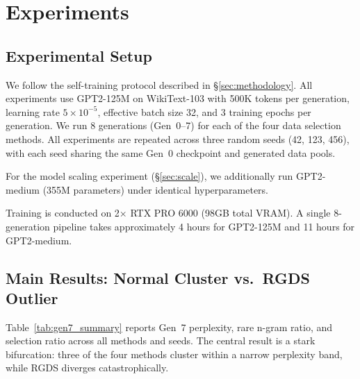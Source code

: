 \section{Experiments}

\subsection{Experimental Setup}

We follow the self-training protocol described in \S\ref{sec:methodology}. All experiments use GPT2-125M on WikiText-103 with 500K tokens per generation, learning rate $5 \times 10^{-5}$, effective batch size 32, and 3 training epochs per generation. We run 8 generations (Gen~0--7) for each of the four data selection methods. All experiments are repeated across three random seeds (42, 123, 456), with each seed sharing the same Gen~0 checkpoint and generated data pools.

For the model scaling experiment (\S\ref{sec:scale}), we additionally run GPT2-medium (355M parameters) under identical hyperparameters.

Training is conducted on 2$\times$ RTX PRO 6000 (98GB total VRAM). A single 8-generation pipeline takes approximately 4 hours for GPT2-125M and 11 hours for GPT2-medium.

\subsection{Main Results: Normal Cluster vs.\ RGDS Outlier}
\label{sec:main_results}

Table~\ref{tab:gen7_summary} reports Gen~7 perplexity, rare n-gram ratio, and selection ratio across all methods and seeds. The central result is a stark bifurcation: three of the four methods cluster within a narrow perplexity band, while RGDS diverges catastrophically.

